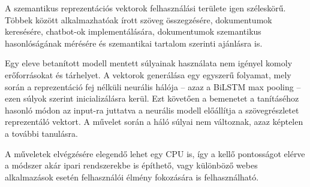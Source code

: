 A szemantikus reprezentációs vektorok felhasználási területe igen széleskörű. Többek között alkalmazhatóak írott szöveg összegzésére, dokumentumok keresésére, chatbot-ok implementálására, dokumentumok szemantikus hasonlóságának mérésére és szemantikai tartalom szerinti ajánlásra is.

Egy eleve betanított modell mentett súlyainak használata nem igényel komoly erőforrásokat és tárhelyet. A vektorok generálása egy egyszerű folyamat, mely során a reprezentáció fej nélküli neurális hálója – azaz a BiLSTM max pooling – ezen súlyok szerint inicializálásra kerül. Ezt követően a bemenetet a tanításéhoz hasonló módon az input-ra juttatva a neurális modell előállítja a szövegrészletet reprezentáló vektort. A művelet során a háló súlyai nem változnak, azaz képtelen a további tanulásra.

A műveletek elvégzésére elegendő lehet egy CPU is, így a kellő pontosságot elérve a módszer akár ipari rendszerekbe is építhető, vagy különböző webes alkalmazások esetén felhasználói élmény fokozására is felhasználható.



